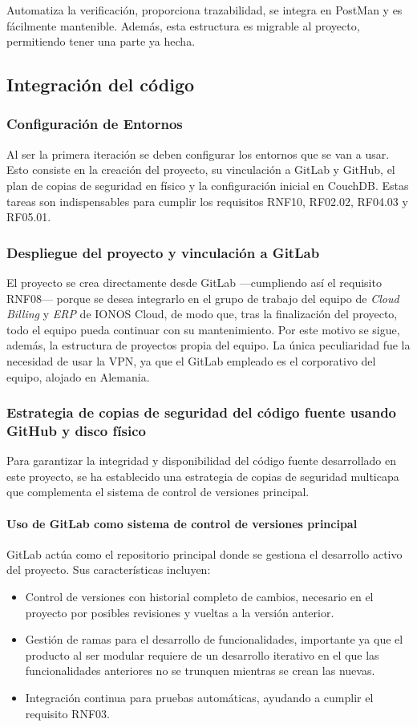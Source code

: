 Automatiza la verificación, proporciona trazabilidad, se integra en PostMan y es fácilmente mantenible. Además, esta estructura es migrable al proyecto, permitiendo tener una parte ya hecha.

\subsection{Integración del código}
\subsubsection{Configuración de Entornos}
Al ser la primera iteración se deben configurar los entornos que se van a usar.
Esto consiste en la creación del proyecto, su vinculación a GitLab y GitHub,
el plan de copias de seguridad en físico y la configuración inicial en CouchDB. Estas tareas son indispensables para cumplir los requisitos RNF10, RF02.02, RF04.03 y RF05.01.  
\subsubsection{Despliegue del proyecto y vinculación a GitLab}
El proyecto se crea directamente desde GitLab ---cumpliendo así el requisito RNF08--- porque se desea integrarlo en el grupo de trabajo del equipo de \textit{Cloud Billing} y \textit{ERP} de IONOS Cloud, de modo que, tras la finalización del proyecto, todo el equipo pueda continuar con su mantenimiento. Por este motivo se sigue, además, la estructura de proyectos propia del equipo. La única peculiaridad fue la necesidad de usar la VPN, ya que el GitLab empleado es el corporativo del equipo, alojado en Alemania.

\subsubsection{Estrategia de copias de seguridad del código fuente usando GitHub y disco físico}
Para garantizar la integridad y disponibilidad del código fuente desarrollado en este proyecto,
se ha establecido una estrategia de copias de seguridad multicapa que complementa el sistema de
control de versiones principal.

\paragraph{Uso de GitLab como sistema de control de versiones principal}
GitLab actúa como el repositorio principal donde se gestiona el desarrollo activo del proyecto.
Sus características incluyen:
\begin{itemize}
    \item Control de versiones con historial completo de cambios, necesario en el proyecto por posibles revisiones y vueltas a la versión anterior.
    \item Gestión de ramas para el desarrollo de funcionalidades, importante ya que el producto al ser modular requiere de un desarrollo iterativo en el que las funcionalidades anteriores no se trunquen mientras se crean las nuevas.
    \item Integración continua para pruebas automáticas, ayudando a cumplir el requisito RNF03.
\end{itemize}

